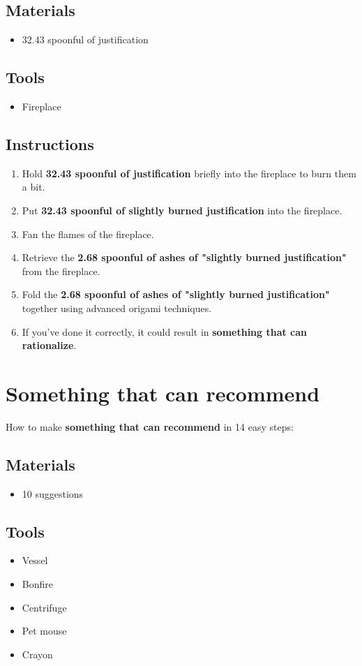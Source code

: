 \documentclass{article}
\begin{document}
\subsection{Materials}\begin{itemize}
\item 
32.43 spoonful of justification
\end{itemize}
\subsection{Tools}\begin{itemize}
\item 
Fireplace
\end{itemize}
\subsection{Instructions}\begin{enumerate}
\item 
Hold \textbf{32.43 spoonful of justification} briefly into the fireplace to burn them a bit.
\item 
Put \textbf{32.43 spoonful of slightly burned justification} into the fireplace.
\item 
Fan the flames of the fireplace.
\item 
Retrieve the \textbf{2.68 spoonful of ashes of "slightly burned justification"} from the fireplace.
\item 
Fold the \textbf{2.68 spoonful of ashes of "slightly burned justification"} together using advanced origami techniques.
\item 
If you've done it correctly, it could result in \textbf{something that can rationalize}.
\end{enumerate}
\newpage
\section{Something that can recommend}How to make \textbf{something that can recommend} in 14 easy steps:

\subsection{Materials}\begin{itemize}
\item 
10 suggestions
\end{itemize}
\subsection{Tools}\begin{itemize}
\item 
Vessel
\item 
Bonfire
\item 
Centrifuge
\item 
Pet mouse
\item 
Crayon
\end{itemize}
\end{document}
